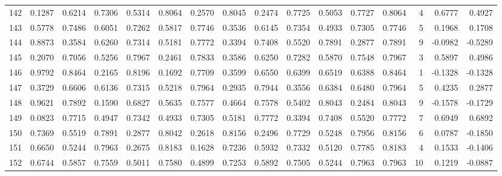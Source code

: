 \begin{tabular}{lrrrrrrrrrrrrrrr}
142 &      0.1287 &  0.6214 &  0.7306 &  0.5314 &  0.8064 &  0.2570 &  0.8045 &  0.2474 &  0.7725 &  0.5053 &   0.7727 &     0.8064 &      4 &                    0.6777 &                     0.4927 \\
143 &      0.5778 &  0.7486 &  0.6051 &  0.7262 &  0.5817 &  0.7746 &  0.3536 &  0.6145 &  0.7354 &  0.4933 &   0.7305 &     0.7746 &      5 &                    0.1968 &                     0.1708 \\
144 &      0.8873 &  0.3584 &  0.6260 &  0.7314 &  0.5181 &  0.7772 &  0.3394 &  0.7408 &  0.5520 &  0.7891 &   0.2877 &     0.7891 &      9 &                   -0.0982 &                    -0.5289 \\
145 &      0.2070 &  0.7056 &  0.5256 &  0.7967 &  0.2461 &  0.7833 &  0.3586 &  0.6250 &  0.7282 &  0.5870 &   0.7548 &     0.7967 &      3 &                    0.5897 &                     0.4986 \\
146 &      0.9792 &  0.8464 &  0.2165 &  0.8196 &  0.1692 &  0.7709 &  0.3599 &  0.6550 &  0.6399 &  0.6519 &   0.6388 &     0.8464 &      1 &                   -0.1328 &                    -0.1328 \\
147 &      0.3729 &  0.6606 &  0.6136 &  0.7315 &  0.5218 &  0.7964 &  0.2935 &  0.7944 &  0.3556 &  0.6384 &   0.6480 &     0.7964 &      5 &                    0.4235 &                     0.2877 \\
148 &      0.9621 &  0.7892 &  0.1590 &  0.6827 &  0.5635 &  0.7577 &  0.4664 &  0.7578 &  0.5402 &  0.8043 &   0.2484 &     0.8043 &      9 &                   -0.1578 &                    -0.1729 \\
149 &      0.0823 &  0.7715 &  0.4947 &  0.7342 &  0.4933 &  0.7305 &  0.5181 &  0.7772 &  0.3394 &  0.7408 &   0.5520 &     0.7772 &      7 &                    0.6949 &                     0.6892 \\
150 &      0.7369 &  0.5519 &  0.7891 &  0.2877 &  0.8042 &  0.2618 &  0.8156 &  0.2496 &  0.7729 &  0.5248 &   0.7956 &     0.8156 &      6 &                    0.0787 &                    -0.1850 \\
151 &      0.6650 &  0.5244 &  0.7963 &  0.2675 &  0.8183 &  0.1628 &  0.7236 &  0.5932 &  0.7332 &  0.5120 &   0.7785 &     0.8183 &      4 &                    0.1533 &                    -0.1406 \\
152 &      0.6744 &  0.5857 &  0.7559 &  0.5011 &  0.7580 &  0.4899 &  0.7253 &  0.5892 &  0.7505 &  0.5244 &   0.7963 &     0.7963 &     10 &                    0.1219 &                    -0.0887 \\

\end{tabular}
